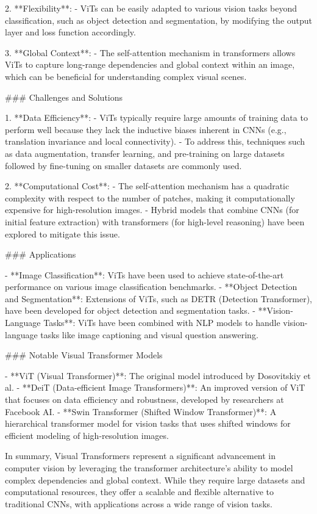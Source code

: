 2. **Flexibility**:
   - ViTs can be easily adapted to various vision tasks beyond classification, such as object detection and segmentation, by modifying the output layer and loss function accordingly.

3. **Global Context**:
   - The self-attention mechanism in transformers allows ViTs to capture long-range dependencies and global context within an image, which can be beneficial for understanding complex visual scenes.

### Challenges and Solutions

1. **Data Efficiency**:
   - ViTs typically require large amounts of training data to perform well because they lack the inductive biases inherent in CNNs (e.g., translation invariance and local connectivity).
   - To address this, techniques such as data augmentation, transfer learning, and pre-training on large datasets followed by fine-tuning on smaller datasets are commonly used.

2. **Computational Cost**:
   - The self-attention mechanism has a quadratic complexity with respect to the number of patches, making it computationally expensive for high-resolution images.
   - Hybrid models that combine CNNs (for initial feature extraction) with transformers (for high-level reasoning) have been explored to mitigate this issue.

### Applications

- **Image Classification**: ViTs have been used to achieve state-of-the-art performance on various image classification benchmarks.
- **Object Detection and Segmentation**: Extensions of ViTs, such as DETR (Detection Transformer), have been developed for object detection and segmentation tasks.
- **Vision-Language Tasks**: ViTs have been combined with NLP models to handle vision-language tasks like image captioning and visual question answering.

### Notable Visual Transformer Models

- **ViT (Visual Transformer)**: The original model introduced by Dosovitskiy et al.
- **DeiT (Data-efficient Image Transformers)**: An improved version of ViT that focuses on data efficiency and robustness, developed by researchers at Facebook AI.
- **Swin Transformer (Shifted Window Transformer)**: A hierarchical transformer model for vision tasks that uses shifted windows for efficient modeling of high-resolution images.

In summary, Visual Transformers represent a significant advancement in computer vision by leveraging the transformer architecture's ability to model complex dependencies and global context. While they require large datasets and computational resources, they offer a scalable and flexible alternative to traditional CNNs, with applications across a wide range of vision tasks.